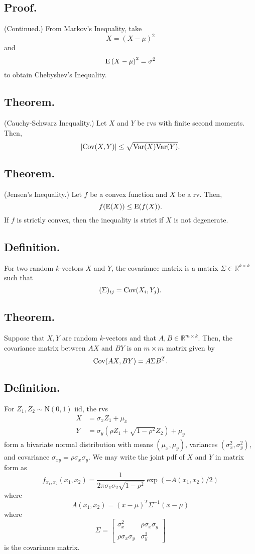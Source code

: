 \documentclass[titlepage]{article}
\begin{document}
\subsection{Proof.} (Continued.) From Markov's Inequality, take 
$$X = (X - \mu)^{2}$$
and 
$$\text{E}\left(X - \mu\right)^{2} = \sigma^{2}$$
to obtain Chebyshev's Inequality.

\subsection{Theorem.} (Cauchy-Schwarz Inequality.) Let $X$ and $Y$ be rvs with finite second moments. Then,
$$|\text{Cov}(X, Y)| \leq \sqrt{\text{Var}(X)\text{Var}(Y)}.$$

\subsection{Theorem.} (Jensen's Inequality.) Let $f$ be a convex function and $X$ be a rv. Then,
$$f(\text{E}(X)) \leq \text{E}(f(X)).$$
If $f$ is strictly convex, then the inequality is strict if $X$ is not degenerate.

\subsection{Definition.} For two random $k$-vectors $X$ and $Y$, the covariance matrix is a matrix $\Sigma \in \mathbb{R}^{k \times k}$ such that
$$(\Sigma)_{ij} = \text{Cov}(X_{i}, Y_{j}).$$

\subsection{Theorem.} Suppose that $X,Y$ are random $k$-vectors and that $A, B \in \mathbb{R}^{m \times k}$. Then, the covariance matrix between $AX$ and $BY$ is an $m \times m$ matrix given by 
$$\text{Cov}(AX, BY) = A\Sigma B^{T}.$$

\subsection{Definition.} For $Z_{1}, Z_{2} \sim \text{N}(0, 1)$ iid, the rvs
\begin{align*}
    X &= \sigma_{x}Z_{1} + \mu_{x} \\
    Y &= \sigma_{y}(\rho Z_{1} + \sqrt{1 - \rho^{2}}Z_{2}) + \mu_{y}
\end{align*}
form a bivariate normal distribution with means $(\mu_{x}, \mu_{y})$, variances $(\sigma_{x}^{2}, \sigma_{y}^{2})$, and covariance $\sigma_{xy} = \rho\sigma_{x}\sigma_{y}$. We may write the joint pdf of $X$ and $Y$ in matrix form as 
$$f_{x_{1},x_{2}}(x_{1}, x_{2}) = \frac{1}{2\pi\sigma_{1}\sigma_{2}\sqrt{1-\rho^{2}}}\exp(-A(x_{1}, x_{2})/2)$$
where 
$$A(x_{1}, x_{2}) = (x-\mu)^{T}\Sigma^{-1}(x-\mu)$$
where 
$$\Sigma = \begin{bmatrix} \sigma_{x}^{2} & \rho\sigma_{x}\sigma_{y} \\ \rho\sigma_{x}\sigma_{y} & \sigma_{y}^{2} \end{bmatrix}$$
is the covariance matrix.
\end{document}
